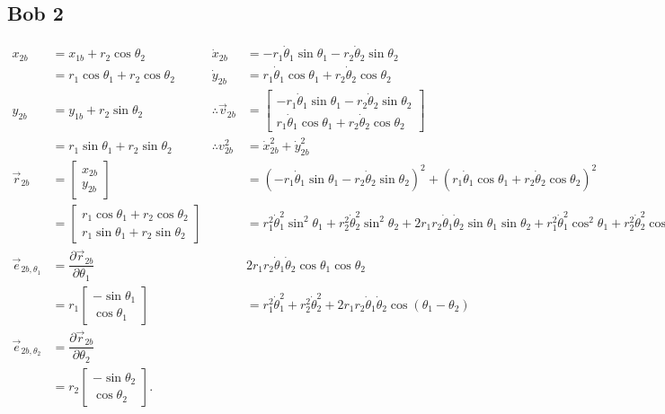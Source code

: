 \documentclass[12pt,a4paper,portrait]{article}
\begin{document}
	\subsection{Bob 2}
	\begin{align*}
		x_{2b} &= x_{1b} + r_2 \cos{\theta_2} &\dot{x}_{2b} &= -r_1\dot{\theta}_1 \sin{\theta_1}-r_2\dot{\theta}_2 \sin{\theta_2}\\
		&= r_1 \cos{\theta_1} + r_2 \cos{\theta_2} & \dot{y}_{2b} &= r_1\dot{\theta}_1 \cos{\theta_1}+r_2\dot{\theta}_2 \cos{\theta_2} \\ 
		y_{2b} &= y_{1b} + r_2 \sin{\theta_2} & \therefore \vec{v}_{2b} &= \begin{bmatrix}
			-r_1\dot{\theta}_1 \sin{\theta_1}-r_2\dot{\theta}_2 \sin{\theta_2}\\
			r_1\dot{\theta}_1 \cos{\theta_1}+r_2\dot{\theta}_2 \cos{\theta_2}
		\end{bmatrix}\\
		&= r_1 \sin{\theta_1} + r_2 \sin{\theta_2} & \therefore v_{2b}^2 &= \dot{x}_{2b}^2 + \dot{y}_{2b}^2 \\
		\vec{r}_{2b}&= \begin{bmatrix}
			x_{2b} \\
			y_{2b}
		\end{bmatrix}& &= \left(-r_1\dot{\theta}_1 \sin{\theta_1}-r_2\dot{\theta}_2 \sin{\theta_2}\right)^2 + \left(r_1\dot{\theta}_1 \cos{\theta_1}+r_2\dot{\theta}_2 \cos{\theta_2}\right)^2 \\
		&= \begin{bmatrix}
			r_1 \cos{\theta_1} + r_2 \cos{\theta_2}\\
			r_1 \sin{\theta_1} + r_2 \sin{\theta_2}
		\end{bmatrix} & &= r_1^2 \dot{\theta}_1^2 \sin^2{\theta_1} + r_2^2 \dot{\theta}_2^2 \sin^2{\theta_2} + 2r_1 r_2 \dot{\theta}_1\dot{\theta}_2 \sin{\theta_1}\sin{\theta_2} + r_1^2 \dot{\theta}_1^2 \cos^2{\theta_1} + r_2^2 \dot{\theta}_2^2 \cos^2{\theta_2} + \\
		\vec{e}_{2b,\theta_1} &= \dfrac{\partial \vec{r}_{2b}}{\partial \theta_1} && 2r_1 r_2 \dot{\theta}_1 \dot{\theta}_2 \cos{\theta_1}\cos{\theta_2} \\
		&= r_1\begin{bmatrix}
			-\sin{\theta_1} \\
			\cos{\theta_1}
		\end{bmatrix}& &= r_1^2 \dot{\theta}_1^2 + r_2^2 \dot{\theta}_2^2 + 2r_1 r_2 \dot{\theta}_1 \dot{\theta}_2 \cos{\left(\theta_1-\theta_2\right)}\\
		\vec{e}_{2b,\theta_2} &= \dfrac{\partial \vec{r}_{2b}}{\partial \theta_2} \\
		&= r_2 \begin{bmatrix}
			-\sin{\theta_2} \\
			\cos{\theta_2}
		\end{bmatrix}.
	\end{align*}
	
\end{document}
